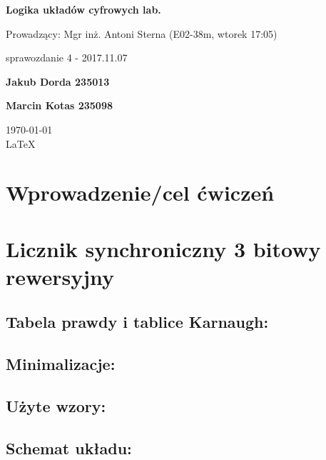 \documentclass[12pt,a4paper]{article}
\begin{document}
	
	\begin{titlepage}
		
		\centering
		{\huge\bfseries Logika układów cyfrowych lab.\par}
		
		\vspace{0.5cm}
		Prowadzący: Mgr inż. Antoni Sterna (E02-38m, wtorek 17:05) \\
	
		\vspace{1.1cm}
		{\Large sprawozdanie 4 - 2017.11.07\par}
		\vfill
		
		{\large\bfseries Jakub Dorda 235013\par}
		{\large\bfseries Marcin Kotas 235098\par}
		
		\vspace{1cm}
		\today \\ \LaTeX
		
		\restoregeometry
	\end{titlepage}

	
	\section{Wprowadzenie/cel ćwiczeń}
	
	
		
	\section{Licznik synchroniczny 3 bitowy rewersyjny}
		
		\subsection{Tabela prawdy i tablice Karnaugh:}
			
			
			
		\subsection{Minimalizacje:}
		
		
		
		\subsection{Użyte wzory:}
		
			
	
		\subsection{Schemat układu:}
		
\end{document}
